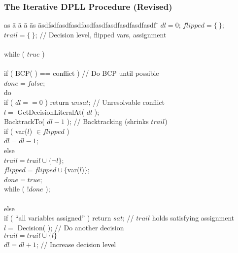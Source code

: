 \begin{frame}
  \frametitle{The Iterative DPLL Procedure (Revised)}

  \scriptsize

  \vfill

  \begin{tabbing}
  as \= a \= a \= a \= as \= asdfsdfasdfasdfasdfasdfasdfasdfasdfasdf \= \kill
  \> $dl = 0$; $flipped = \{\ \}$; $trail = \{\ \}$;    \> \> \> \> \> // Decision level, flipped vars, assignment\\ \\
  \> while ( $true$ ) \\ \\
  \> \> if ( BCP( ) == conflict )                          \> \> \> \> // Do BCP until possible \\
  \> \> \> $done = false$; \\
  \> \> \> do \\
  \> \> \> \> if ( $dl == 0$ ) return $unsat$;                   \> \> // Unresolvable conflict \\
  \> \> \> \> $l = $ {\sc GetDecisionLiteralAt}( $dl$ ); \\
  \> \> \> \> {\sc BacktrackTo}( $dl - 1$ );                         \> \> // Backtracking (shrinks $trail$) \\
  \> \> \> \> if ( var($l$) $\in flipped$ ) \\
  \> \> \> \> \> $dl = dl - 1$; \\
  \> \> \> \> else \\
  \> \> \> \> \> $trail = trail \cup \{ \neg l \}$; \\ 
  \> \> \> \> \> $flipped = flipped \cup \{ $var($l$)$ \}$; \\ 
  \> \> \> \> \> $done = true$; \\
  \> \> \> while ( !$done$ ); \\ \\
  \> \> else \\
  \> \> \> if ( ``all variables assigned'' ) return $sat$;    \> \> \> // $trail$ holds satisfying assignment \\
  \> \> \> $l = $ {\sc Decision}( );                                \> \> \> // Do another decision \\
  \> \> \> $trail = trail \cup \{ l \}$ \\
  \> \> \> $dl = dl + 1$;                                     \> \> \> // Increase decision level \\
  \end{tabbing}

  \vfill

\end{frame}

